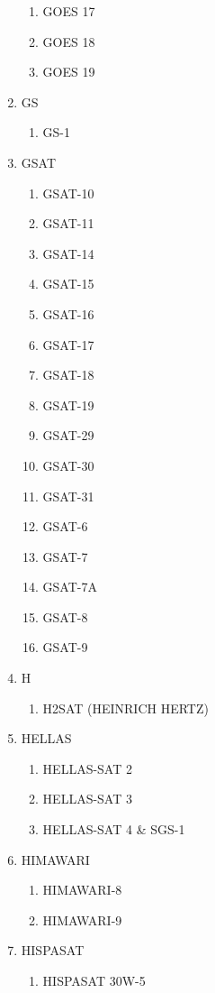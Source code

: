 \begin{multicols}{2}
\begin{enumerate}
\begin{enumerate}
    \item GOES 17
    \item GOES 18
    \item GOES 19
  \end{enumerate}
  \item GS
  \begin{enumerate}
    \item GS-1
  \end{enumerate}
  \item GSAT
  \begin{enumerate}
    \item GSAT-10
    \item GSAT-11
    \item GSAT-14
    \item GSAT-15
    \item GSAT-16
    \item GSAT-17
    \item GSAT-18
    \item GSAT-19
    \item GSAT-29
    \item GSAT-30
    \item GSAT-31
    \item GSAT-6
    \item GSAT-7
    \item GSAT-7A
    \item GSAT-8
    \item GSAT-9
  \end{enumerate}
  \item H
  \begin{enumerate}
    \item H2SAT (HEINRICH HERTZ)
  \end{enumerate}
  \item HELLAS
  \begin{enumerate}
    \item HELLAS-SAT 2
    \item HELLAS-SAT 3
    \item HELLAS-SAT 4 \& SGS-1
  \end{enumerate}
  \item HIMAWARI
  \begin{enumerate}
    \item HIMAWARI-8
    \item HIMAWARI-9
  \end{enumerate}
  \item HISPASAT
  \begin{enumerate}
    \item HISPASAT 30W-5

\end{enumerate}
\end{enumerate}
\end{multicols}
